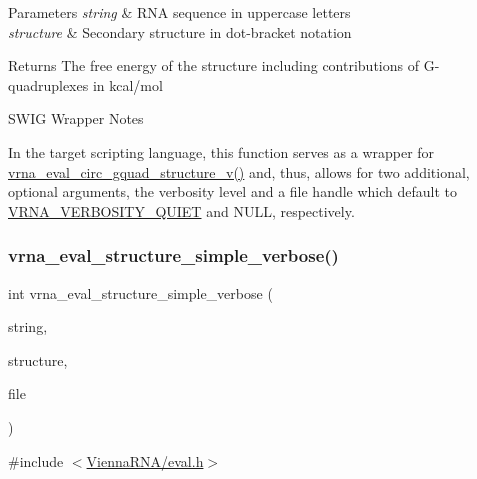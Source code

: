 \begin{DoxyParams}{Parameters}
{\em string} & R\+NA sequence in uppercase letters \\
\hline
{\em structure} & Secondary structure in dot-\/bracket notation \\
\hline
\end{DoxyParams}
\begin{DoxyReturn}{Returns}
The free energy of the structure including contributions of G-\/quadruplexes in kcal/mol
\end{DoxyReturn}
\begin{DoxyRefDesc}{S\+W\+I\+G Wrapper Notes}
\item[\mbox{\hyperlink{wrappers__wrappers000056}{S\+W\+I\+G Wrapper Notes}}]In the target scripting language, this function serves as a wrapper for \mbox{\hyperlink{group__eval_gab96a6c59923ff06c35f8c2fd2c239727}{vrna\+\_\+eval\+\_\+circ\+\_\+gquad\+\_\+structure\+\_\+v()}} and, thus, allows for two additional, optional arguments, the verbosity level and a file handle which default to \mbox{\hyperlink{group__eval_gaf4afe19780b61b4962c613bde324128b}{V\+R\+N\+A\+\_\+\+V\+E\+R\+B\+O\+S\+I\+T\+Y\+\_\+\+Q\+U\+I\+ET}} and N\+U\+LL, respectively. \end{DoxyRefDesc}
\mbox{\label{group__eval_gaf928bfd96767e1b8033a95a4cc432e39}} 
\subsubsection{\texorpdfstring{vrna\_eval\_structure\_simple\_verbose()}{vrna\_eval\_structure\_simple\_verbose()}}
{\footnotesize\ttfamily int vrna\+\_\+eval\+\_\+structure\+\_\+simple\+\_\+verbose (\begin{DoxyParamCaption}\item[{const char $\ast$}]{string,  }\item[{const char $\ast$}]{structure,  }\item[{F\+I\+LE $\ast$}]{file }\end{DoxyParamCaption})}



{\ttfamily \#include $<$\mbox{\hyperlink{eval_8h}{Vienna\+R\+N\+A/eval.\+h}}$>$}



